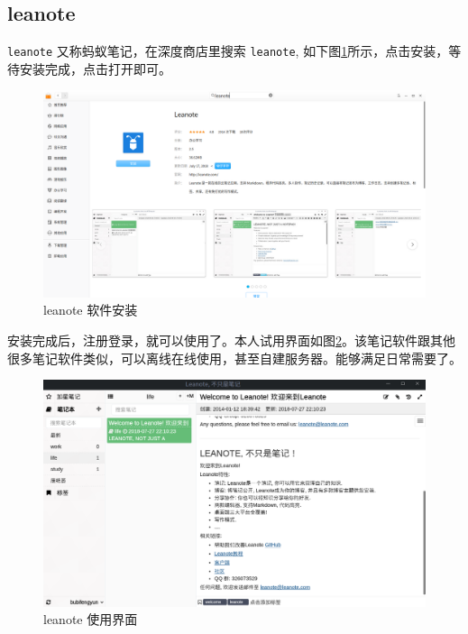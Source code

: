 \documentclass[doctor,openright,twoside]{sjtuthesis}
\newcommand{\passthrough}[1]{#1}
\theoremstyle{plain}
\theoremstyle{definition}
\theoremstyle{remark}
\theoremstyle{ocrenumbox}
\theoremstyle{plain}
\begin{document}
\hypertarget{leanote}{%
\subsection{leanote}\label{leanote}}

\passthrough{\lstinline!leanote!} 又称蚂蚁笔记，在深度商店里搜索 \passthrough{\lstinline!leanote!}, 如下图\ref{fig:leanote-install}所示，点击安装，等待安装完成，点击打开即可。

\begin{figure}

{\centering \includegraphics[width=1\linewidth]{images/education-leanote-install} 

}

\caption[leanote 软件安装]{leanote 软件安装}\label{fig:leanote-install}
\end{figure}

安装完成后，注册登录，就可以使用了。本人试用界面如图\ref{fig:leanote-use}。该笔记软件跟其他很多笔记软件类似，可以离线在线使用，甚至自建服务器。能够满足日常需要了。

\begin{figure}

{\centering \includegraphics[width=1\linewidth]{images/education-leanote-use} 

}

\caption[leanote 使用界面]{leanote 使用界面}\label{fig:leanote-use}
\end{figure}
\end{document}
